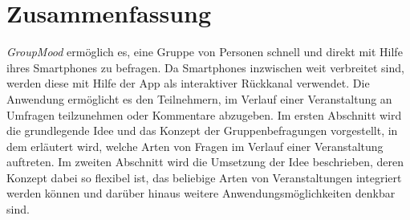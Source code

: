 \section*{Zusammenfassung}

\emph{GroupMood} ermöglich es, eine Gruppe von Personen schnell und direkt mit Hilfe ihres Smartphones zu befragen. Da Smartphones inzwischen weit verbreitet sind, werden diese mit Hilfe der App als interaktiver Rückkanal verwendet. Die Anwendung ermöglicht es den Teilnehmern, im Verlauf einer Veranstaltung an Umfragen teilzunehmen oder Kommentare abzugeben. Im ersten Abschnitt wird die grundlegende Idee und das Konzept der Gruppenbefragungen vorgestellt, in dem erläutert wird, welche Arten von Fragen im Verlauf einer Veranstaltung auftreten. Im zweiten Abschnitt wird die Umsetzung der Idee beschrieben, deren Konzept dabei so flexibel ist, das beliebige Arten von Veranstaltungen integriert werden können und darüber hinaus weitere Anwendungsmöglichkeiten denkbar sind.
